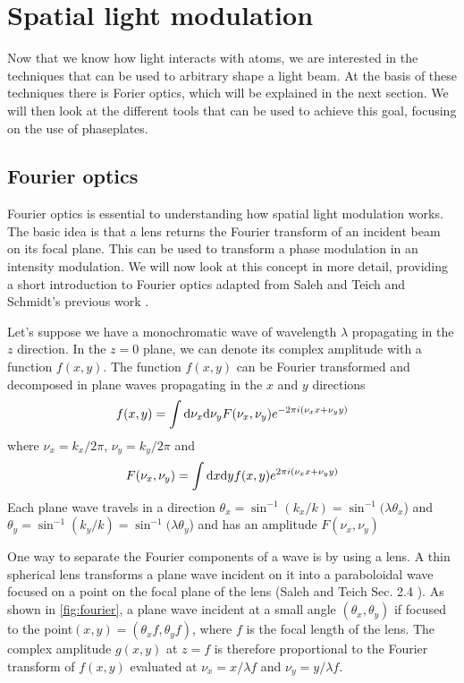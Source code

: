 \section{Spatial light modulation}
Now that we know how light interacts with atoms, we are interested in the techniques that can be used to arbitrary shape a light beam. At the basis of these techniques there is Forier optics, which will be explained in the next section. We will then look at the different tools that can be used to achieve this goal, focusing on the use of phaseplates.

\subsection{Fourier optics}
Fourier optics is essential to understanding how spatial light modulation works. The basic idea  is that a lens returns the Fourier transform of an incident beam on its focal plane. This can be used to transform a phase modulation in an intensity modulation. We will now look at this concept in more detail, providing a short introduction to Fourier optics adapted from Saleh and Teich \cite{saleh1991} and Schmidt's previous work \cite{schmidt2021}.

Let's suppose we have a monochromatic wave of wavelength $\lambda$ propagating in the $z$ direction. In the $z=0$ plane, we can denote its complex amplitude with a function $f(x,y)$. The function $f(x,y)$ can be Fourier transformed and decomposed in plane waves propagating in the $x$ and $y$ directions
\begin{equation}
    f(x,y) = \int \differential \nu_x \differential \nu_y F(\nu_x, \nu_y) e^{-2\pi i(\nu_xx+\nu_yy)}
\end{equation}
where $\nu_x = k_x / 2\pi$, $\nu_y = k_y / 2\pi$ and
\begin{equation}
    F(\nu_x,\nu_y) = \int \differential x \differential y f(x, y) e^{2\pi i(\nu_xx+\nu_yy)}
\end{equation}
Each plane wave travels in a direction $\theta_x = \sin^{-1}(k_x / k) = \sin^{-1}(\lambda \theta_x$) and $\theta_y = \sin^{-1}(k_y / k) = \sin^{-1}(\lambda \theta_y$) and has an amplitude $F(\nu_x, \nu_y)$

One way to separate the Fourier components of a wave is by using a lens. A thin spherical lens transforms a plane wave incident on it into a paraboloidal wave focused on a point on the focal plane of the lens (Saleh and Teich Sec. 2.4 \cite{saleh1991}). As shown in \cref{fig:fourier}, a plane wave incident at a small angle $(\theta_x, \theta_y)$ if focused to the point$(x,y) = (\theta_x f, \theta_y f)$, where $f$ is the focal length of the lens. The complex amplitude $g(x,y)$ at $z=f$ is therefore proportional to the Fourier transform of $f(x,y)$ evaluated at $\nu_x = x / \lambda f$ and $\nu_y = y / \lambda f$.

